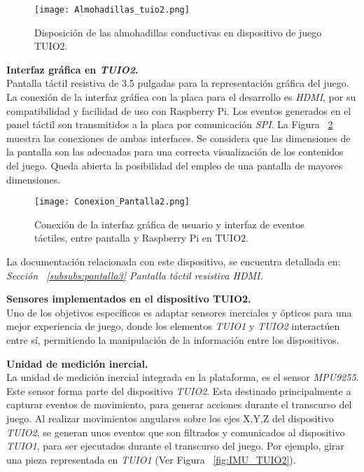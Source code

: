 \begin{figure}[!h]
\begin{center}
\texttt{[image: Almohadillas\_tuio2.png]}
\caption{Disposición de las almohadillas conductivas en dispositivo de juego TUIO2.}
\label{fig:Almohadillas_tuio2}
\end{center}
\end{figure}

\textbf{Interfaz gráfica en \emph{TUIO2}.}\\
Pantalla táctil resistiva de 3.5 pulgadas para la representación gráfica del juego.
La conexión de la interfaz gráfica con la placa para el desarrollo es \emph{HDMI}, por su compatibilidad y facilidad de uso con Raspberry Pi. Los eventos generados en el panel táctil son transmitidos a la placa por comunicación \emph{SPI}. La Figura ~\ref{fig:Conexion_Pantalla2} muestra las conexiones de ambas interfaces.
Se considera que las dimensiones de la pantalla son las adecuadas para una correcta visualización de los contenidos del juego. Queda abierta la posibilidad del empleo de una pantalla de mayores dimensiones.

\begin{figure}[!h]
\begin{center}
\texttt{[image: Conexion\_Pantalla2.png]}
\caption{Conexión de la interfaz gráfica de usuario y interfaz de eventos táctiles, entre pantalla y Raspberry Pi en TUIO2.}
\label{fig:Conexion_Pantalla2}
\end{center}
\end{figure}

La documentación relacionada con este dispositivo, se encuentra detallada en: \emph{Sección ~\ref{subsubs:pantalla3} Pantalla táctil resistiva HDMI.}

\textbf{Sensores implementados en el dispositivo TUIO2.}\\

Uno de los objetivos específicos es adaptar sensores inerciales y ópticos para una mejor experiencia de juego, donde los elementos \emph{TUIO1} y \emph{TUIO2} interactúen entre sí, permitiendo la manipulación de la información entre los dispositivos.

\textbf{Unidad de medición inercial.}\\
La unidad de medición inercial integrada en la plataforma, es el sensor \emph{MPU9255}. Este sensor forma parte del dispositivo \emph{TUIO2}. Esta destinado principalmente a capturar eventos de movimiento, para generar acciones durante el transcurso del juego. Al realizar movimientos angulares sobre los ejes X,Y,Z del dispositivo \emph{TUIO2}, se generan unos eventos que son filtrados y comunicados al dispositivo \emph{TUIO1}, para ser ejecutados durante el transcurso del juego. Por ejemplo, girar una pieza representada en \emph{TUIO1} (Ver Figura ~\ref{fig:IMU_TUIO2}).

